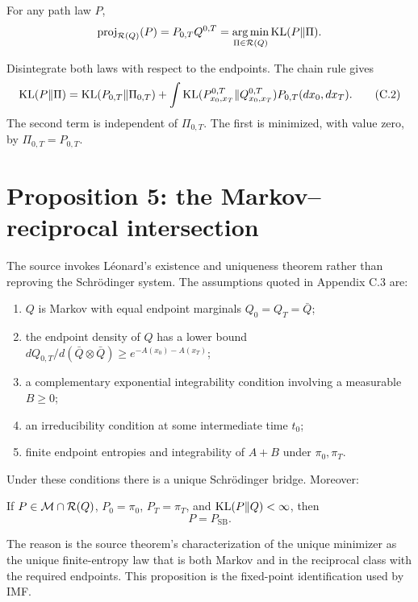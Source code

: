 \begin{proposition}[Proposition 4]
For any path law \(P\),
\[
 \operatorname{proj}_{\mathcal R(Q)}(P)=P_{0,T}Q^{0,T}
 =\operatorname*{arg\,min}_{\Pi\in\mathcal R(Q)}\mathrm{KL}(P\|\Pi).
\]
\end{proposition}

Disintegrate both laws with respect to the endpoints.  The chain rule gives
\begin{equation}
 \mathrm{KL}(P\|\Pi)
 =\mathrm{KL}(P_{0,T}\|\Pi_{0,T})
 +\int\mathrm{KL}(P^{0,T}_{x_0,x_T}\|Q^{0,T}_{x_0,x_T})P_{0,T}(dx_0,dx_T).
 \tag{C.2}\label{eq:DSBM-chain-endpoint}
\end{equation}
The second term is independent of \(\Pi_{0,T}\).  The first is minimized, with value zero, by \(\Pi_{0,T}=P_{0,T}\).

\section{Proposition 5: the Markov--reciprocal intersection}

The source invokes L\'eonard's existence and uniqueness theorem \cite{Leonard2014Survey,LeonardRoellyZambrini2014} rather than reproving the Schr\"odinger system.  The assumptions quoted in Appendix C.3 are:
\begin{enumerate}[leftmargin=2em]
\item \(Q\) is Markov with equal endpoint marginals \(Q_0=Q_T=\bar Q\);
\item the endpoint density of \(Q\) has a lower bound \(dQ_{0,T}/d(\bar Q\otimes\bar Q)\ge e^{-A(x_0)-A(x_T)}\);
\item a complementary exponential integrability condition involving a measurable \(B\ge0\);
\item an irreducibility condition at some intermediate time \(t_0\);
\item finite endpoint entropies and integrability of \(A+B\) under \(\pi_0,\pi_T\).
\end{enumerate}
Under these conditions there is a unique Schr\"odinger bridge.  Moreover:

\begin{proposition}[Proposition 5]
If \(P\in\mathcal{M}\cap\mathcal R(Q)\), \(P_0=\pi_0\), \(P_T=\pi_T\), and \(\mathrm{KL}(P\|Q)<\infty\), then
\[
 P=P_{\mathrm{SB}}.
\]
\end{proposition}

The reason is the source theorem's characterization of the unique minimizer as the unique finite-entropy law that is both Markov and in the reciprocal class with the required endpoints.  This proposition is the fixed-point identification used by IMF.


